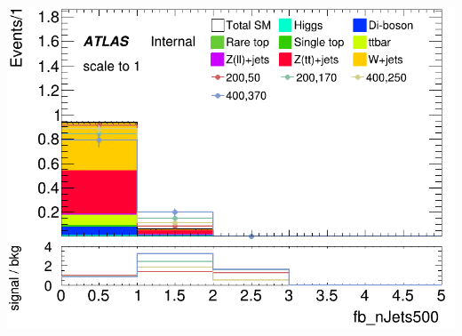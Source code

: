 \documentclass[usenames,dvipsnames]{beamer}
\begin{document}
\begin{frame}
\begin{minipage}{0.32\textwidth}
        \includegraphics[width=\textwidth]{graphics/HH_met_sig/HH_fb_nJets500_norm.png}
    \end{minipage}
\end{frame}
\end{document}
